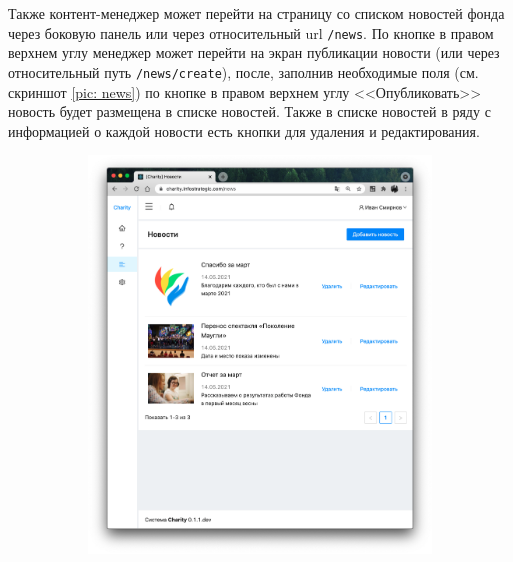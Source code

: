 \documentclass[a4paper,12pt,reqno]{article}
\begin{document}
	Также контент-менеджер может перейти на страницу со списком новостей фонда через боковую панель или через относительный url \texttt{/news}. По кнопке в правом верхнем углу менеджер может перейти на экран публикации новости (или через относительный путь \texttt{/news/create}), после, заполнив необходимые поля (см. скриншот \ref{pic: news}) по кнопке в правом верхнем углу <<Опубликовать>> новость будет размещена в списке новостей. Также в списке новостей в ряду с информацией о каждой новости есть кнопки для удаления и редактирования.
	
	\begin{figure}[H]
		\centering
		\begin{subfigure}[b]{0.475\linewidth}
			\includegraphics[width=\linewidth]{img/ro/news.png}
		\end{subfigure}
		\begin{subfigure}[b]{0.475\linewidth}

\end{subfigure}
\end{figure}
\end{document}
